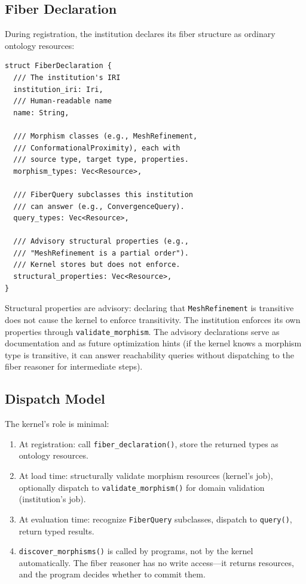 \documentclass[10pt,twocolumn,letterpaper]{article}
\newcommand{\code}[1]{\texttt{\small #1}}
\begin{document}
\subsection{Fiber Declaration}

During registration, the institution declares its fiber structure as ordinary ontology resources:

{\scriptsize
\begin{verbatim}
struct FiberDeclaration {
  /// The institution's IRI
  institution_iri: Iri,
  /// Human-readable name
  name: String,

  /// Morphism classes (e.g., MeshRefinement,
  /// ConformationalProximity), each with
  /// source type, target type, properties.
  morphism_types: Vec<Resource>,

  /// FiberQuery subclasses this institution
  /// can answer (e.g., ConvergenceQuery).
  query_types: Vec<Resource>,

  /// Advisory structural properties (e.g.,
  /// "MeshRefinement is a partial order").
  /// Kernel stores but does not enforce.
  structural_properties: Vec<Resource>,
}
\end{verbatim}
}

Structural properties are advisory: declaring that \code{MeshRefinement} is transitive does not cause the kernel to enforce transitivity.
The institution enforces its own properties through \code{validate\_morphism}.
The advisory declarations serve as documentation and as future optimization hints (if the kernel knows a morphism type is transitive, it can answer reachability queries without dispatching to the fiber reasoner for intermediate steps).

\subsection{Dispatch Model}

The kernel's role is minimal:
\begin{enumerate}
\item At registration: call \code{fiber\_declaration()}, store the returned types as ontology resources.
\item At load time: structurally validate morphism resources (kernel's job), optionally dispatch to \code{validate\_morphism()} for domain validation (institution's job).
\item At evaluation time: recognize \code{FiberQuery} subclasses, dispatch to \code{query()}, return typed results.
\item \code{discover\_morphisms()} is called by programs, not by the kernel automatically. The fiber reasoner has no write access---it returns resources, and the program decides whether to commit them.
\end{enumerate}
\end{document}
